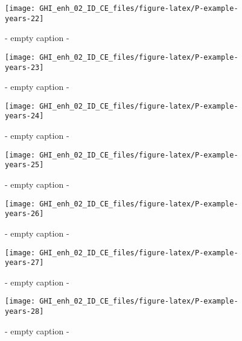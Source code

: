 \documentclass[
  10pt,
  a4paper,oneside]{article}
\begin{document}
\begin{figure}[H]

{\centering \texttt{[image: GHI\_enh\_02\_ID\_CE\_files/figure-latex/P-example-years-22]} 

}

\caption{ - empty caption - }\label{fig:P-example-years-22}
\end{figure}
\begin{figure}[H]

{\centering \texttt{[image: GHI\_enh\_02\_ID\_CE\_files/figure-latex/P-example-years-23]} 

}

\caption{ - empty caption - }\label{fig:P-example-years-23}
\end{figure}
\begin{figure}[H]

{\centering \texttt{[image: GHI\_enh\_02\_ID\_CE\_files/figure-latex/P-example-years-24]} 

}

\caption{ - empty caption - }\label{fig:P-example-years-24}
\end{figure}
\begin{figure}[H]

{\centering \texttt{[image: GHI\_enh\_02\_ID\_CE\_files/figure-latex/P-example-years-25]} 

}

\caption{ - empty caption - }\label{fig:P-example-years-25}
\end{figure}
\begin{figure}[H]

{\centering \texttt{[image: GHI\_enh\_02\_ID\_CE\_files/figure-latex/P-example-years-26]} 

}

\caption{ - empty caption - }\label{fig:P-example-years-26}
\end{figure}
\begin{figure}[H]

{\centering \texttt{[image: GHI\_enh\_02\_ID\_CE\_files/figure-latex/P-example-years-27]} 

}

\caption{ - empty caption - }\label{fig:P-example-years-27}
\end{figure}
\begin{figure}[H]

{\centering \texttt{[image: GHI\_enh\_02\_ID\_CE\_files/figure-latex/P-example-years-28]} 

}

\caption{ - empty caption - }\label{fig:P-example-years-28}
\end{figure}
\end{document}
